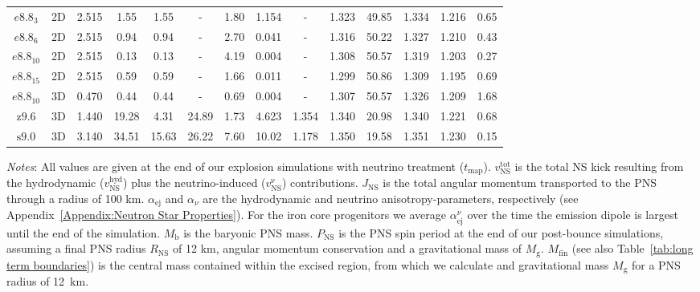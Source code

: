 \documentclass[fleqn,usenatbib]{mnras}
\newcommand{\snine}{\ensuremath{\mathrm{s9.0}}\xspace}
\newcommand{\znine}{\ensuremath{\mathrm{z9.6}}\xspace}
\begin{document}
\begin{table}
\begin{tabular}{ccccccccccc||ccc}
    \hline
    $e8.8_{3}$ & 2D & 2.515 & 1.55  & 1.55  & -     & 1.80  & 1.154 &  -     & 1.323 &  49.85 &  1.334 &  1.216 &  0.65 \\
    $e8.8_{6}$ & 2D & 2.515 & 0.94  & 0.94  & -     & 2.70  & 0.041 &  -     & 1.316 &  50.22 &  1.327 &  1.210 &  0.43 \\
    $e8.8_{10}$& 2D & 2.515 & 0.13  & 0.13  & -     & 4.19  & 0.004 &  -     & 1.308 &  50.57 &  1.319 &  1.203 &  0.27 \\
    $e8.8_{15}$& 2D & 2.515 & 0.59  & 0.59  & -     & 1.66  & 0.011 &  -     & 1.299 &  50.86 &  1.309 &  1.195 &  0.69 \\
    $e8.8_{10}$& 3D & 0.470 & 0.44  & 0.44  & -     & 0.69  & 0.004 &  -     & 1.307 &  50.57 &  1.326 &  1.209 &  1.68  \\
    \znine     & 3D & 1.440 & 19.28 & 4.31  & 24.89 & 1.73  & 4.623 & 1.354  & 1.340 &  20.98 &  1.340 &  1.221 &  0.68 \\
    \snine     & 3D & 3.140 & 34.51 & 15.63 & 26.22 & 7.60  & 10.02 & 1.178  & 1.350 &  19.58 &  1.351 &  1.230 &  0.15  \\
    \hline
\end{tabular}
\flushleft
\textit{Notes}: All values are given at the end of our explosion simulations with neutrino treatment ($t_{\mathrm{map}}$). $v_{\mathrm{NS}}^{\mathrm{tot}}$ is the total NS kick resulting from the hydrodynamic ($v_{\mathrm{NS}}^{\mathrm{hyd}}$) plus the neutrino-induced ($v_{\mathrm{NS}}^{\mathrm{\nu}}$) contributions. $J_{\mathrm{NS}}$ is the total angular momentum transported to the PNS through a radius of 100 km. $\alpha_{\mathrm{ej}}$ and $\alpha_{\nu}$ are the hydrodynamic and neutrino anisotropy-parameters, respectively (see Appendix~\ref{Appendix:Neutron Star Properties}). For the iron core progenitors we average $\alpha_{\mathrm{ej}}^{\nu}$ over the time the emission dipole is largest until the end of the simulation. $M_{\mathrm{b}}$ is the baryonic PNS mass. $P_{\mathrm{NS}}$ is the PNS spin period at the end of our post-bounce simulations, assuming a final PNS radius $R_{\mathrm{NS}}$ of 12 km, angular momentum conservation and a gravitational mass of $M_{\mathrm{g}}$. $M_{\mathrm{fin}}$ (see also Table~\ref{tab:long term boundaries}) is the central mass contained within the excised region, from which we calculate and gravitational mass $M_{\mathrm{g}}$ for a PNS radius of 12~km. 
\end{table}
\end{document}

